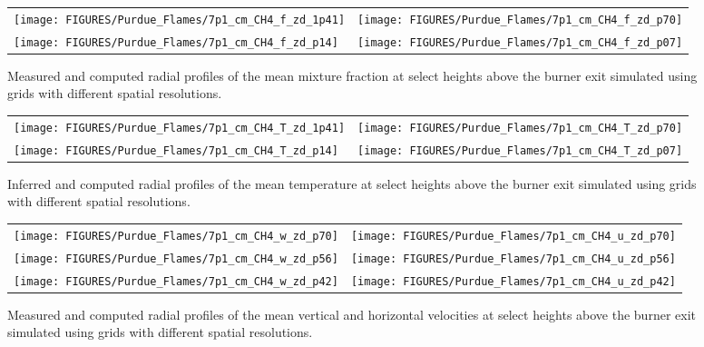 \begin{figure}[p]
\begin{tabular*}{\textwidth}{l@{\extracolsep{\fill}}r}
\texttt{[image: FIGURES/Purdue\_Flames/7p1\_cm\_CH4\_f\_zd\_1p41]} &
\texttt{[image: FIGURES/Purdue\_Flames/7p1\_cm\_CH4\_f\_zd\_p70]} \\
\texttt{[image: FIGURES/Purdue\_Flames/7p1\_cm\_CH4\_f\_zd\_p14]} &
\texttt{[image: FIGURES/Purdue\_Flames/7p1\_cm\_CH4\_f\_zd\_p07]}
\end{tabular*}
\caption[Purdue 7.1 cm methane flame mean mixture fraction profiles]
{Measured \cite{Zhou:CS1998} and computed radial profiles of the mean mixture fraction at select heights above the burner exit simulated using grids with different spatial resolutions.}
\label{Purdue_7p1_CH4_mixture_fraction}
\end{figure}

\begin{figure}[p]
\begin{tabular*}{\textwidth}{l@{\extracolsep{\fill}}r}
\texttt{[image: FIGURES/Purdue\_Flames/7p1\_cm\_CH4\_T\_zd\_1p41]} &
\texttt{[image: FIGURES/Purdue\_Flames/7p1\_cm\_CH4\_T\_zd\_p70]} \\
\texttt{[image: FIGURES/Purdue\_Flames/7p1\_cm\_CH4\_T\_zd\_p14]} &
\texttt{[image: FIGURES/Purdue\_Flames/7p1\_cm\_CH4\_T\_zd\_p07]}
\end{tabular*}
\caption[Purdue 7.1 cm methane flame mean temperature profiles]
{Inferred \cite{Xin:CF2005} and computed radial profiles of the mean temperature at select heights above the burner exit simulated using grids with different spatial resolutions.}
\label{Purdue_7p1_CH4_temperature}
\end{figure}


\begin{figure}[p]
\begin{tabular*}{\textwidth}{l@{\extracolsep{\fill}}r}
\texttt{[image: FIGURES/Purdue\_Flames/7p1\_cm\_CH4\_w\_zd\_p70]} &
\texttt{[image: FIGURES/Purdue\_Flames/7p1\_cm\_CH4\_u\_zd\_p70]} \\
\texttt{[image: FIGURES/Purdue\_Flames/7p1\_cm\_CH4\_w\_zd\_p56]} &
\texttt{[image: FIGURES/Purdue\_Flames/7p1\_cm\_CH4\_u\_zd\_p56]} \\
\texttt{[image: FIGURES/Purdue\_Flames/7p1\_cm\_CH4\_w\_zd\_p42]} &
\texttt{[image: FIGURES/Purdue\_Flames/7p1\_cm\_CH4\_u\_zd\_p42]}
\end{tabular*}
\caption[Purdue 7.1 cm methane flame mean velocity profiles]
{Measured \cite{Zhou:CS1998} and computed radial profiles of the mean vertical and horizontal velocities at select heights above the burner exit simulated using grids with different spatial resolutions.}
\label{Purdue_7p1_CH4_vertical_velocity}
\end{figure}



